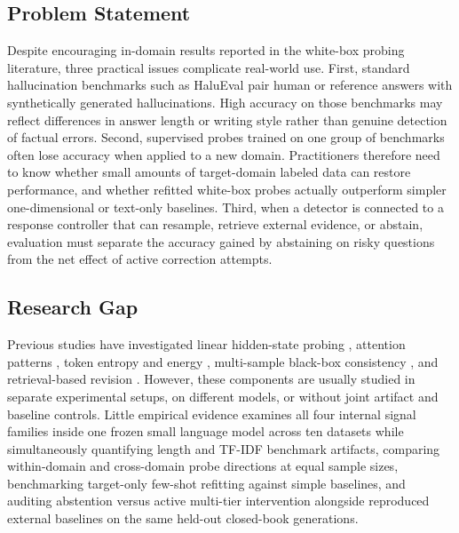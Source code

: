 \documentclass{ieeeaccess}
\begin{document}
\subsection{Problem Statement}
Despite encouraging in-domain results reported in the white-box probing literature, three practical issues complicate real-world use. First, standard hallucination benchmarks such as HaluEval \cite{review29} pair human or reference answers with synthetically generated hallucinations. High accuracy on those benchmarks may reflect differences in answer length or writing style rather than genuine detection of factual errors. Second, supervised probes trained on one group of benchmarks often lose accuracy when applied to a new domain. Practitioners therefore need to know whether small amounts of target-domain labeled data can restore performance, and whether refitted white-box probes actually outperform simpler one-dimensional or text-only baselines. Third, when a detector is connected to a response controller that can resample, retrieve external evidence, or abstain, evaluation must separate the accuracy gained by abstaining on risky questions from the net effect of active correction attempts.

\subsection{Research Gap}
Previous studies have investigated linear hidden-state probing \cite{review27,review28}, attention patterns \cite{review09,review11}, token entropy and energy \cite{review04,review17}, multi-sample black-box consistency \cite{review21}, and retrieval-based revision \cite{review25,review33}. However, these components are usually studied in separate experimental setups, on different models, or without joint artifact and baseline controls. Little empirical evidence examines all four internal signal families inside one frozen small language model across ten datasets while simultaneously quantifying length and TF-IDF benchmark artifacts, comparing within-domain and cross-domain probe directions at equal sample sizes, benchmarking target-only few-shot refitting against simple baselines, and auditing abstention versus active multi-tier intervention alongside reproduced external baselines on the same held-out closed-book generations.
\end{document}
